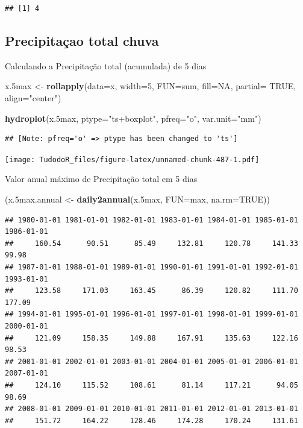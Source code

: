 \documentclass[
]{book}
\newenvironment{Shaded}{\begin{snugshade}}{\end{snugshade}}
\newcommand{\DataTypeTok}[1]{\textcolor[rgb]{0.13,0.29,0.53}{#1}}
\newcommand{\DecValTok}[1]{\textcolor[rgb]{0.00,0.00,0.81}{#1}}
\newcommand{\FloatTok}[1]{\textcolor[rgb]{0.00,0.00,0.81}{#1}}
\newcommand{\KeywordTok}[1]{\textcolor[rgb]{0.13,0.29,0.53}{\textbf{#1}}}
\newcommand{\NormalTok}[1]{#1}
\newcommand{\OtherTok}[1]{\textcolor[rgb]{0.56,0.35,0.01}{#1}}
\newcommand{\StringTok}[1]{\textcolor[rgb]{0.31,0.60,0.02}{#1}}
\begin{document}
\begin{verbatim}
## [1] 4
\end{verbatim}

\hypertarget{precipitauxe7ao-total-chuva}{%
\subsection{Precipitaçao total chuva}\label{precipitauxe7ao-total-chuva}}

Calculando a Precipitação total (acumulada) de 5 dias

\begin{Shaded}
\begin{Highlighting}[]
\NormalTok{x}\FloatTok{.5}\NormalTok{max <-}\StringTok{ }\KeywordTok{rollapply}\NormalTok{(}\DataTypeTok{data=}\NormalTok{x, }\DataTypeTok{width=}\DecValTok{5}\NormalTok{, }\DataTypeTok{FUN=}\NormalTok{sum, }\DataTypeTok{fill=}\OtherTok{NA}\NormalTok{, }\DataTypeTok{partial=} \OtherTok{TRUE}\NormalTok{,}
\DataTypeTok{align=}\StringTok{"center"}\NormalTok{)}

\KeywordTok{hydroplot}\NormalTok{(x}\FloatTok{.5}\NormalTok{max, }\DataTypeTok{ptype=}\StringTok{"ts+boxplot"}\NormalTok{, }\DataTypeTok{pfreq=}\StringTok{"o"}\NormalTok{, }\DataTypeTok{var.unit=}\StringTok{"mm"}\NormalTok{)}
\end{Highlighting}
\end{Shaded}

\begin{verbatim}
## [Note: pfreq='o' => ptype has been changed to 'ts']
\end{verbatim}

\texttt{[image: TudodoR\_files/figure-latex/unnamed-chunk-487-1.pdf]}

Valor anual máximo de Precipitação total em 5 dias

\begin{Shaded}
\begin{Highlighting}[]
\NormalTok{(x}\FloatTok{.5}\NormalTok{max.annual <-}\StringTok{ }\KeywordTok{daily2annual}\NormalTok{(x}\FloatTok{.5}\NormalTok{max, }\DataTypeTok{FUN=}\NormalTok{max, }\DataTypeTok{na.rm=}\OtherTok{TRUE}\NormalTok{))}
\end{Highlighting}
\end{Shaded}

\begin{verbatim}
## 1980-01-01 1981-01-01 1982-01-01 1983-01-01 1984-01-01 1985-01-01 1986-01-01 
##     160.54      90.51      85.49     132.81     120.78     141.33      99.98 
## 1987-01-01 1988-01-01 1989-01-01 1990-01-01 1991-01-01 1992-01-01 1993-01-01 
##     123.58     171.03     163.45      86.39     120.82     111.70     177.09 
## 1994-01-01 1995-01-01 1996-01-01 1997-01-01 1998-01-01 1999-01-01 2000-01-01 
##     121.09     158.35     149.88     167.91     135.63     122.16      98.53 
## 2001-01-01 2002-01-01 2003-01-01 2004-01-01 2005-01-01 2006-01-01 2007-01-01 
##     124.10     115.52     108.61      81.14     117.21      94.05      98.69 
## 2008-01-01 2009-01-01 2010-01-01 2011-01-01 2012-01-01 2013-01-01 
##     151.72     164.22     128.46     174.28     170.24     131.61
\end{verbatim}
\end{document}
